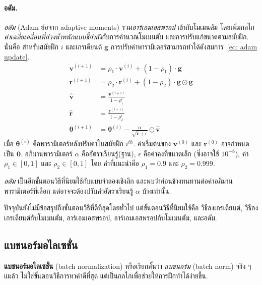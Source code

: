 \paragraph{อดัม.}
\textit{อดัม} (Adam\cite{KingmaBa2015}
ย่อจาก adaptive moments)
รวม\textit{อาร์เอมเอสพรอป}
เข้ากับโมเมนตัม
โดยเพิ่มกลไก\textit{ค่าเฉลี่ยเคลื่อนที่ถ่วงน้ำหนักแบบชี้กำลัง}กับการคำนวณโมเมนตัม
และการปรับแก้ขนาดตามสมัยฝึก.
นั่นคือ
สำหรับสมัยฝึก $i$ 
และเกรเดียนต์ $\bm{g}$
การปรับค่าพารามิเตอร์สามารถทำได้ดังสมการ~\ref{eq: adam update}.
\begin{align}
\bm{v}^{(i+1)} &= \rho_1 \cdot \bm{v}^{(i)} + (1-\rho_1) \cdot \bm{g}
\label{eq: adam 1st moment} \\
\bm{r}^{(i+1)} &= \rho_2 \cdot \bm{r}^{(i)} + (1-\rho_2) \cdot \bm{g} \odot \bm{g}
\label{eq: adam 2nd moment} \\
\bm{\hat{v}} &= \frac{\bm{v}^{(i+1)}}{1-\rho_1^i}
\label{eq: adam bias correct 1st} \\
\bm{\hat{r}} &= \frac{\bm{r}^{(i+1)}}{1-\rho_2^i}
\label{eq: adam bias correct 2nd} \\
\bm{\theta}^{(i+1)} &=  
\bm{\theta}^{(i)} - \frac{\alpha}{\sqrt{\bm{\hat{r}} + \epsilon}} \odot \bm{\hat{v}}
\label{eq: adam update}
\end{align}
เมื่อ $\bm{\theta}^{(i)}$ 
คือพารามิเตอร์หลังปรับค่าในสมัยฝึก $i^{th}$.
ค่าเริ่มต้นของ $\bm{v}^{(0)}$ และ $\bm{r}^{(0)}$
อาจกำหนดเป็น $\bm{0}$.
อภิมานพารามิเตอร์ $\alpha$ คืออัตราเรียนรู้(ฐาน),
$\epsilon$ คือค่าคงที่ขนาดเล็ก (ซึ่งอาจใช้ $10^{-8}$),
ค่า $\rho_1 \in [0,1]$ และ $\rho_2 \in [0,1]$
โดย ค่าที่แนะนำคือ $\rho_1 = 0.9$ และ $\rho_2 = 0.999$.

\textit{อดัม} เป็นอีกขั้นตอนวิธีที่นิยมใช้กับแบบจำลองเชิงลึก
และพบว่าค่อนข้างทนทานต่อค่าอภิมานพารามิเตอร์ที่เลือก แต่อาจจะต้องปรับค่าอัตราเรียนรู้ $\alpha$ บ้างเท่านั้น.

ปัจจุบันยังไม่มีข้อสรุปถึงขั้นตอนวิธีที่ดีที่สุดโดยทั่วไป
แต่ขั้นตอนวิธีที่นิยมใช้คือ\cite{GoodfellowEtAl2016}
วิธีลงเกรเดียนต์,
วิธีลงเกรเดียนต์กับโมเมนตัม,
อาร์เอมเอสพรอป,
อาร์เอมเอสพรอปกับโมเมนตัม,
และอดัม.

\subsection{แบชนอร์มอไลเซชั่น}
\label{sec: batch norm}

\textbf{แบชนอร์มอไลเซชั่น} (batch normalization)
หรือเรียกสั้นว่า \textit{แบชนอร์ม} (batch norm)
จริง ๆ แแล้ว ไม่ใช่ขั้นตอนวิธีการหาค่าดีที่สุด 
แต่เป็นกลไกเพื่อช่วยให้การฝึกทำได้ง่ายขึ้น.

